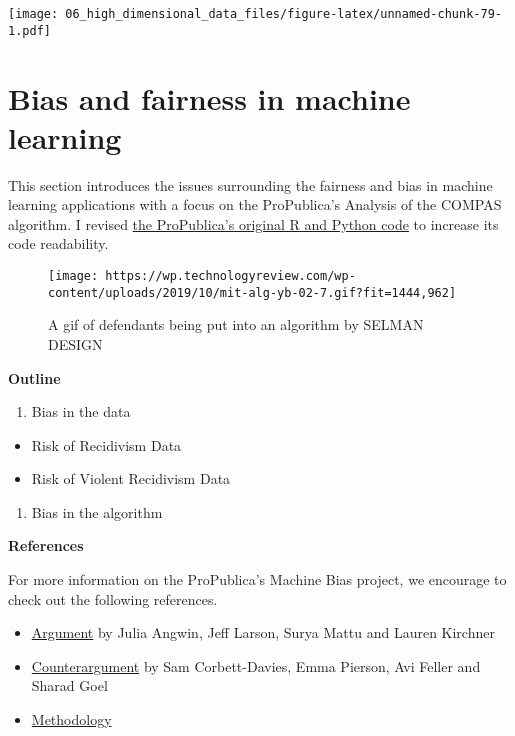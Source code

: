 \documentclass[
]{book}
\providecommand{\tightlist}{%
  \setlength{\itemsep}{0pt}\setlength{\parskip}{0pt}}
\begin{document}
\texttt{[image: 06\_high\_dimensional\_data\_files/figure-latex/unnamed-chunk-79-1.pdf]}

\hypertarget{bias-and-fairness-in-machine-learning}{%
\section{Bias and fairness in machine learning}\label{bias-and-fairness-in-machine-learning}}

This section introduces the issues surrounding the fairness and bias in machine learning applications with a focus on the ProPublica's Analysis of the COMPAS algorithm. I revised \href{https://github.com/propublica/compas-analysis/blob/master/Compas\%20Analysis.ipynb}{the ProPublica's original R and Python code} to increase its code readability.

\begin{figure}
\centering
\texttt{[image: https://wp.technologyreview.com/wp-content/uploads/2019/10/mit-alg-yb-02-7.gif?fit=1444,962]}
\caption{A gif of defendants being put into an algorithm by SELMAN DESIGN}
\end{figure}

\textbf{Outline}

\begin{enumerate}
\def\labelenumi{\arabic{enumi}.}
\tightlist
\item
  Bias in the data
\end{enumerate}

\begin{itemize}
\tightlist
\item
  Risk of Recidivism Data
\item
  Risk of Violent Recidivism Data
\end{itemize}

\begin{enumerate}
\def\labelenumi{\arabic{enumi}.}
\setcounter{enumi}{1}
\tightlist
\item
  Bias in the algorithm
\end{enumerate}

\textbf{References}

For more information on the ProPublica's Machine Bias project, we encourage to check out the following references.

\begin{itemize}
\item
  \href{https://www.propublica.org/article/machine-bias-risk-assessments-in-criminal-sentencing/}{Argument} by Julia Angwin, Jeff Larson, Surya Mattu and Lauren Kirchner
\item
  \href{https://www.washingtonpost.com/news/monkey-cage/wp/2016/10/17/can-an-algorithm-be-racist-our-analysis-is-more-cautious-than-propublicas/}{Counterargument} by Sam Corbett-Davies, Emma Pierson, Avi Feller and Sharad Goel
\item
  \href{https://www.propublica.org/article/how-we-analyzed-the-compas-recidivism-algorithm/}{Methodology}
\end{itemize}
\end{document}
